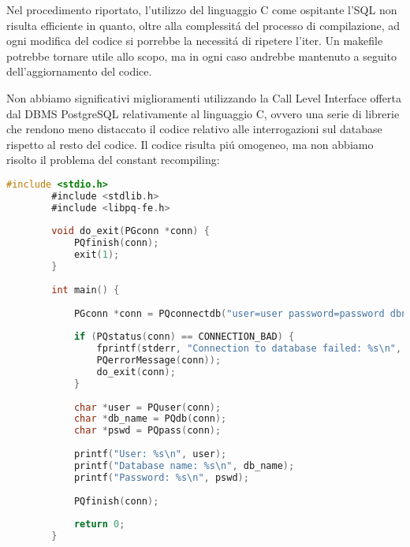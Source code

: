 \documentclass[12pt,a4paper,onecolumn,x11names]{article}
\begin{document}
		\begin{flushleft}
			Nel procedimento riportato, l'utilizzo del linguaggio C come ospitante l'SQL non risulta efficiente in quanto, oltre alla complessit\'{a} del processo di compilazione, ad ogni modifica del codice si porrebbe la necessit\'{a} di ripetere l'iter. Un makefile potrebbe tornare utile allo scopo, ma in ogni caso andrebbe mantenuto a seguito dell'aggiornamento del codice.\newline
			
			Non abbiamo significativi miglioramenti utilizzando la Call Level Interface offerta dal DBMS PostgreSQL relativamente al linguaggio C, ovvero una serie di librerie che rendono meno distaccato il codice relativo alle interrogazioni sul database rispetto al resto del codice.\newline
			Il codice risulta pi\'{u} omogeneo, ma non abbiamo risolto il problema del constant recompiling:\newline
			
		\end{flushleft}
		
		\begin{lstlisting}[language=C, caption=testPGSQL.c]
		#include <stdio.h>
		#include <stdlib.h>
		#include <libpq-fe.h>
		
		void do_exit(PGconn *conn) {
			PQfinish(conn);
			exit(1);
		}
		
		int main() {
		
			PGconn *conn = PQconnectdb("user=user password=password dbname=testDB");
			
			if (PQstatus(conn) == CONNECTION_BAD) {
				fprintf(stderr, "Connection to database failed: %s\n",
				PQerrorMessage(conn));
				do_exit(conn);
			}
			
			char *user = PQuser(conn);
			char *db_name = PQdb(conn);
			char *pswd = PQpass(conn);
			
			printf("User: %s\n", user);
			printf("Database name: %s\n", db_name);
			printf("Password: %s\n", pswd);
			
			PQfinish(conn);
			
			return 0;
		}
		\end{lstlisting}
		
\end{document}
